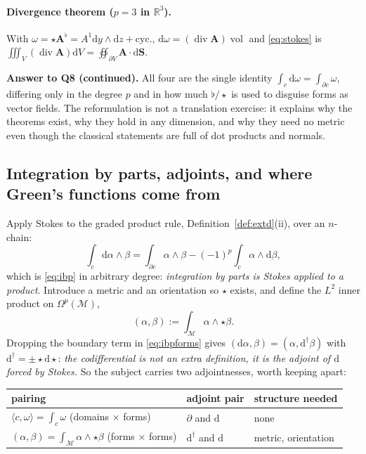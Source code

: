 \documentclass[10pt,a4paper]{article}
\newcommand{\dd}{\mathrm{d}}
\newcommand{\R}{\mathbb{R}}
\newcommand{\M}{\mathcal{M}}
\newcommand{\Om}{\Omega}
\newcommand{\A}{\mathbf{A}}
\DeclareMathOperator{\dive}{div}
\DeclareMathOperator{\vol}{vol}
\newcommand{\pair}[2]{\langle #1 , #2 \rangle}
\theoremstyle{plain}
\theoremstyle{definition}
\numberwithin{equation}{section}
\begin{document}
\paragraph{Divergence theorem ($p=3$ in $\R^3$).} With
$\omega=\star\A^\flat=A^1\dd y\wedge\dd z+\text{cyc.}$, $\dd\omega=(\dive\A)\vol$ and
\eqref{eq:stokes} is $\iiint_V(\dive\A)\dd V=\oiint_{\partial V}\A\cdot\dd\mathbf S$.

\begin{keybox}
\textbf{Answer to Q8 (continued).} All four are the single identity
$\int_c\dd\omega=\int_{\partial c}\omega$, differing only in the degree $p$ and in how much
$\flat/\star$ is used to disguise forms as vector fields. The reformulation is not a translation
exercise: it explains why the theorems exist, why they hold in any dimension, and why they need
no metric even though the classical statements are full of dot products and normals.
\end{keybox}

\subsection{Integration by parts, adjoints, and where Green's functions come from}
\label{sec:adjoint}

Apply Stokes to the graded product rule, Definition~\ref{def:extd}(ii), over an $n$-chain:
\begin{equation}
\int_c\dd\alpha\wedge\beta=\int_{\partial c}\alpha\wedge\beta-(-1)^p\int_c\alpha\wedge\dd\beta ,
\label{eq:ibpforms}
\end{equation}
which is \eqref{eq:ibp} in arbitrary degree: \emph{integration by parts is Stokes applied to a
product}. Introduce a metric and an orientation so $\star$ exists, and define the
$L^2$ inner product on $\Om^p(\M)$,
\begin{equation}
(\alpha,\beta):=\int_\M\alpha\wedge\star\beta .
\label{eq:l2}
\end{equation}
Dropping the boundary term in \eqref{eq:ibpforms} gives
$(\dd\alpha,\beta)=(\alpha,\dd^\dagger\beta)$ with $\dd^\dagger=\pm\star\dd\star$: \emph{the
codifferential is not an extra definition, it is the adjoint of $\dd$ forced by Stokes.} So the
subject carries two adjointnesses, worth keeping apart:
\begin{center}\small
\renewcommand{\arraystretch}{1.15}
\begin{tabular}{@{}lll@{}}
\toprule
pairing & adjoint pair & structure needed \\
\midrule
$\pair{c}{\omega}=\int_c\omega$ (domains $\times$ forms) & $\partial$ and $\dd$ & none \\
$(\alpha,\beta)=\int_\M\alpha\wedge\star\beta$ (forms $\times$ forms) & $\dd^\dagger$ and $\dd$
  & metric, orientation \\
\bottomrule
\end{tabular}
\end{center}
\end{document}
